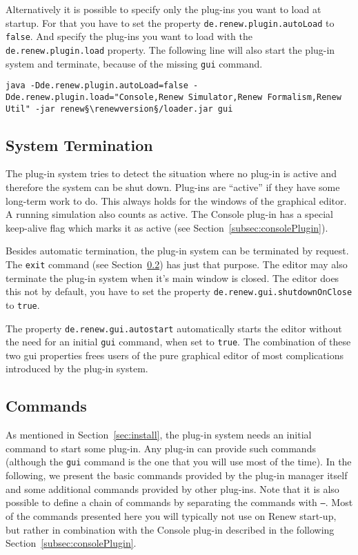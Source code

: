 Alternatively it is possible to specify only the plug-ins you want to load at startup. For that you have to set the property \texttt{de.renew.plugin.autoLoad} to \texttt{false}. And specify the plug-ins you want to load with the \texttt{de.renew.plugin.load} property. The following line will also start the plug-in system and terminate, because of the missing \texttt{gui} command. 

\begin{lstlisting}[style=xnonfloating]
  java -Dde.renew.plugin.autoLoad=false -Dde.renew.plugin.load="Console,Renew Simulator,Renew Formalism,Renew Util" -jar renew§\renewversion§/loader.jar gui
\end{lstlisting}

\subsection{System Termination}
\label{subsec:systemExit}
The plug-in system tries to detect the situation where no plug-in
is active and therefore the system can be shut down.
Plug-ins are ``active'' if they have some long-term work to do.
This always holds for the windows of the graphical editor.
A running simulation also counts as active.
The Console plug-in has a special keep-alive flag which marks it
as active (see Section~\ref{subsec:consolePlugin}).

Besides automatic termination, the plug-in system can be
terminated by request.
The \texttt{exit} command (see
Section~\ref{subsec:pluginCommands}) has just that purpose.
The editor may also terminate the plug-in system when it's main
window is closed. 
The editor does this not by default, you have to set the property
\texttt{de.renew.gui.shutdownOnClose} to \texttt{true}.

The property \texttt{de.renew.gui.autostart} automatically starts
the editor without the need for an initial \texttt{gui} command,
when set to \texttt{true}.
The combination of these two gui properties frees users of the
pure graphical editor of most complications introduced by the
plug-in system.


\subsection{Commands}
\label{subsec:pluginCommands}

As mentioned in Section~\ref{sec:install}, the plug-in system
needs an initial command to start some plug-in.
Any plug-in can provide such commands (although the \texttt{gui}
command is the one that you will use most of the time). In the
following, we present the basic commands provided by the plug-in
manager itself and some additional commands provided by other
plug-ins. Note that it is also possible to define a chain of commands
by separating the commands with \texttt{---}. Most of the commands
presented here you will typically not use on Renew start-up, but
rather in combination with the Console plug-in described in the
following Section~\ref{subsec:consolePlugin}.

